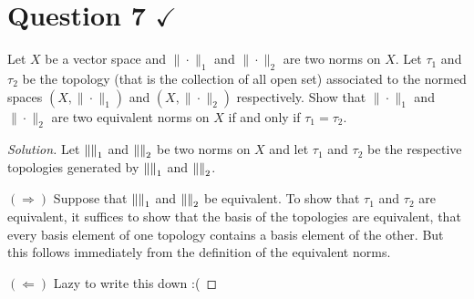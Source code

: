 \section{Question 7 \texorpdfstring{$\checkmark$}{}}
\horz
 Let $X$ be a vector space and $\|\cdot\|_1$ and $\|\cdot\|_2$ are two norms on $X.$ Let $\tau_1$ and $\tau_2$ be the topology (that is the collection of all open set) associated to the  normed spaces $(X,\|\cdot\|_1)$ and $(X,\|\cdot\|_2)$ respectively. Show that $\|\cdot\|_1$ and $\|\cdot\|_2$ are two equivalent norms on $X$ if and only if $\tau_1=\tau_2.$
\horz
\begin{proof}[Solution]
    Let $\left\lVert  \right\rVert_{1}$ and $\left\lVert  \right\rVert_{2}$ be two norms on $X$ and let $\tau_{1}$ and $\tau_{2}$ be the respective topologies generated by $\left\lVert  \right\rVert_{1}$ and $\left\lVert  \right\rVert_{2}$.

    $\left( \Longrightarrow \right)$ Suppose that $\left\lVert  \right\rVert_{1}$ and $\left\lVert  \right\rVert_{2}$ be equivalent. To show that $\tau_{1}$ and $\tau_{2}$ are equivalent, it suffices to show that the basis of the topologies are equivalent, that every basis element of one topology contains a basis element of the other. But this follows immediately from the definition of the equivalent norms.

    $\left( \Longleftarrow \right)$ Lazy to write this down :(
\end{proof}
